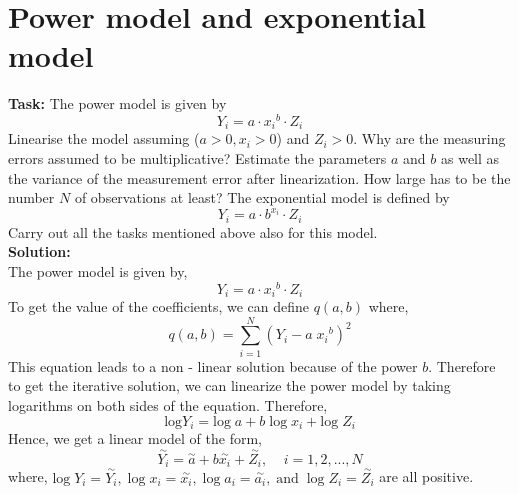 

\section{Power model and exponential model }
\noindent \textbf{Task:} The power model is given by
$$ Y_i = a \cdot {x_i}^b \cdot Z_i  $$
\noindent Linearise the model assuming ($a > 0, x_i > 0$) and $Z_i > 0.$ Why are the measuring errors assumed to be multiplicative? Estimate the parameters $a$ and $b$ as well as the variance of the measurement error after linearization. How large has to be the number $N$ of observations at least? The exponential model is defined by
$$  Y_i = a \cdot b^{x_i} \cdot Z_i   $$
\noindent Carry out all the tasks mentioned above also for this model.\\
\noindent \textbf{Solution:}\\
The power model is given by,
$$ Y_i = a \cdot {x_i}^b \cdot Z_i  $$
\noindent To get the value of the coefficients, we can define $q(a,b)$ where,
$$ q(a,b) = \sum_{i=1}^{N} (Y_i - a\; {x_i}^b)^2 $$
\noindent This equation leads to a non - linear solution because of the power $b.$ Therefore to get the iterative solution, we can linearize the power model by taking logarithms on both sides of the equation. Therefore,
$$\text{log}Y_i = \text{log}\;a + b\; \text{log}\; x_i + \text{log}\; Z_i$$
\noindent Hence, we get a linear model of the form,
$$\overset{\sim}{Y_i} = \overset{\sim}{a} + b\overset{\sim}{x_i} + \overset{\sim}{Z_i},\;\;\;\; i =1,2,...,N$$
\noindent where, $ \text{log}\; Y_i = \overset{\sim}{Y_i},\; \text{log}\; x_i = \overset{\sim}{x_i},\;\text{log}\; a_i = \overset{\sim}{a_i}, \;\text{and} \; \; \text{log}\; Z_i = \overset{\sim}{Z_i}$ are all positive.

